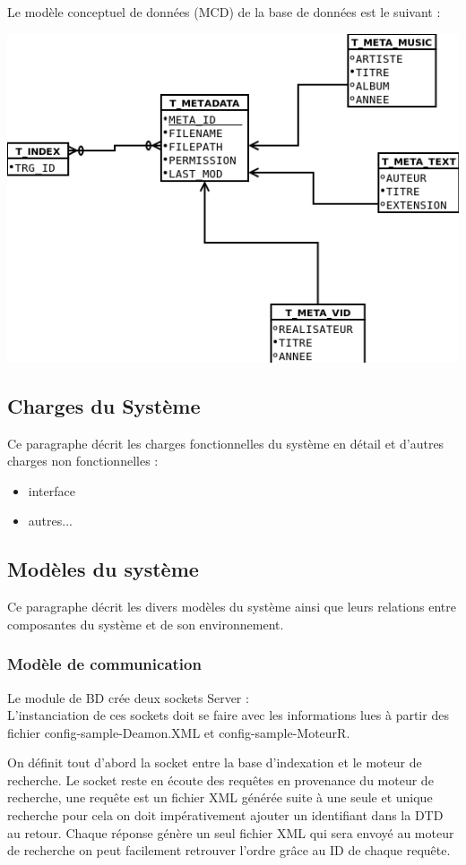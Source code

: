 Le modèle conceptuel de données (MCD) de la base de données est le suivant :
\begin{center}
\includegraphics[scale=0.7]{mcd.png}
\end{center}


\subsection{Charges du Système}
Ce paragraphe décrit les charges fonctionnelles du système en détail et d'autres charges non fonctionnelles : 
\begin{itemize}
 \item interface
 \item autres...
\end{itemize}

\subsection{Modèles du système}
Ce paragraphe décrit les divers modèles du système ainsi que leurs relations entre composantes du système et de son environnement.

\subsubsection{Modèle de communication}
Le module de BD crée deux sockets Server :\\
L’instanciation de ces sockets doit se faire avec les informations lues à partir des fichier config-sample-Deamon.XML et config-sample-MoteurR.

On définit tout d'abord la socket entre la base d'indexation et le moteur de recherche. Le socket reste en écoute 
des requêtes en provenance du moteur de recherche, une requête est un fichier XML générée suite à une seule et unique recherche pour 
cela on doit impérativement ajouter un identifiant dans la DTD au retour. Chaque réponse génère un seul fichier 
XML qui sera envoyé au moteur de recherche on peut facilement retrouver l'ordre grâce au ID de chaque requête. 

